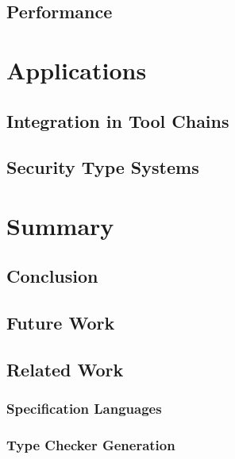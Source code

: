 \documentclass[a4paper,twoside]{report}
\begin{document}
\section{Performance}

\chapter{Applications}
\section{Integration in Tool Chains}
\section{Security Type Systems}

\chapter{Summary}
\section{Conclusion}
\section{Future Work}
\section{Related Work}
\subsection{Specification Languages}
\subsection{Type Checker Generation}


\end{document}
